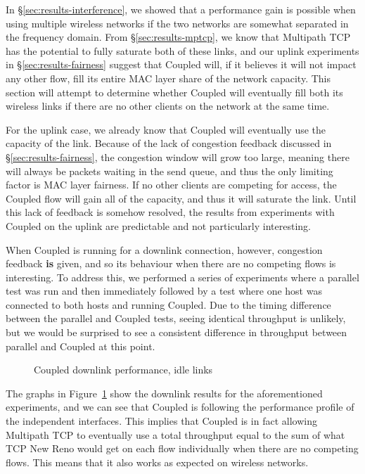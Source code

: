In \S\ref{sec:results-interference}, we showed that a performance gain is
possible when using multiple wireless networks if the two networks are somewhat 
separated in the frequency domain. From \S\ref{sec:results-mptcp}, we know that 
Multipath TCP has the potential to fully saturate both of these links, and
our uplink experiments in \S\ref{sec:results-fairness} suggest that 
Coupled will, if it believes it will not impact any other flow, fill 
its entire MAC layer share of the network capacity. This section will attempt to 
determine whether Coupled will eventually fill both its wireless links if there 
are no other clients on the network at the same time.

For the uplink case, we already know that Coupled will eventually use the
capacity of the link. Because of the lack of congestion feedback discussed in
\S\ref{sec:results-fairness}, the congestion window will grow too large,
meaning there will always be packets waiting in the send queue, and thus the
only limiting factor is MAC layer fairness. If no other clients are competing
for access, the Coupled flow will gain all of the capacity, and thus it
will saturate the link. Until this lack of feedback is somehow resolved, the 
results from experiments with Coupled on the uplink are predictable and not
particularly interesting.

When Coupled is running for a downlink connection, however, congestion feedback
\textbf{is} given, and so its behaviour when there are no competing flows is 
interesting. To address this, we performed a series of 
experiments where a parallel test was run and then immediately followed by a 
test where one host was connected to both hosts and running Coupled. Due to the 
timing difference between the parallel and Coupled tests, seeing identical 
throughput is unlikely, but we would be surprised to see a consistent difference 
in throughput between parallel and Coupled at this point.

\begin{figure}[h]
 \centering
 
 \caption{Coupled downlink performance, idle links}\label{graph:coupled-performance}
\end{figure}

The graphs in Figure~\ref{graph:coupled-performance} show the downlink results
for the aforementioned experiments, and we can see that Coupled is
following the performance profile of the independent interfaces. This implies
that Coupled is in fact allowing Multipath TCP to eventually use a total
throughput equal to the sum of what TCP New Reno would get on each flow
individually when there are no competing flows. This means that it also works as
expected on wireless networks.
